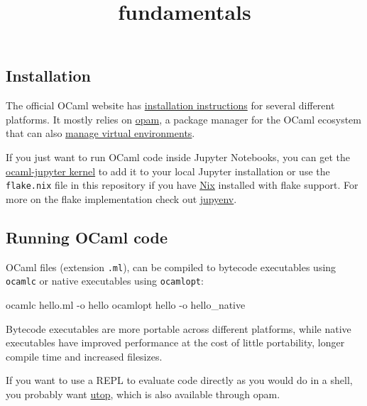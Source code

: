 \documentclass[11pt]{article}
\title{fundamentals}
\newenvironment{Shaded}{}{}
\newcommand{\NormalTok}[1]{{#1}}
\newcommand{\ExtensionTok}[1]{{#1}}
\newcommand{\AttributeTok}[1]{\textcolor[rgb]{0.49,0.56,0.16}{{#1}}}
\begin{document}
    
    \maketitle
    
    

    
    \subsection{Installation}\label{installation}

    The official OCaml website has
\href{https://ocaml.org/install}{installation instructions} for several
different platforms. It mostly relies on
\href{https://opam.ocaml.org/}{opam}, a package manager for the OCaml
ecosystem that can also
\href{https://opam.ocaml.org/doc/Usage.html\#opam-switch}{manage virtual
environments}.

    If you just want to run OCaml code inside Jupyter Notebooks, you can get
the \href{https://github.com/akabe/ocaml-jupyter}{ocaml-jupyter kernel}
to add it to your local Jupyter installation or use the
\texttt{flake.nix} file in this repository if you have
\href{https://nixos.org/}{Nix} installed with flake support. For more on
the flake implementation check out
\href{https://github.com/tweag/jupyenv}{jupyenv}.

    \subsection{Running OCaml code}\label{running-ocaml-code}

    OCaml files (extension \texttt{.ml}), can be compiled to bytecode
executables using \texttt{ocamlc} or native executables using
\texttt{ocamlopt}:

\begin{Shaded}
\begin{Highlighting}[]
\ExtensionTok{ocamlc}\NormalTok{ hello.ml }\AttributeTok{{-}o}\NormalTok{ hello}
\ExtensionTok{ocamlopt}\NormalTok{ hello }\AttributeTok{{-}o}\NormalTok{ hello\_native}
\end{Highlighting}
\end{Shaded}

Bytecode executables are more portable across different platforms, while
native executables have improved performance at the cost of little
portability, longer compile time and increased filesizes.

    If you want to use a REPL to evaluate code directly as you would do in a
shell, you probably want
\href{https://github.com/ocaml-community/utop}{utop}, which is also
available through opam.
\end{document}

